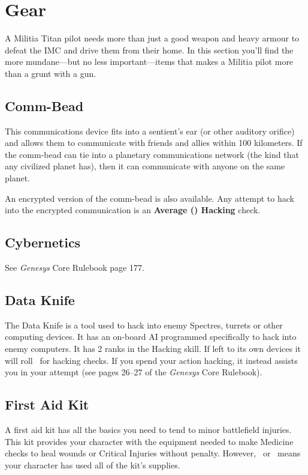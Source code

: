 \documentclass[9pt, openany]{extbook}
\begin{document}
\section{Gear}

A Militia Titan pilot needs more than just a good weapon and heavy armour to defeat the IMC and drive them from their home. In this section you'll find the more mundane---but no less important---items that makes a Militia pilot more than a grunt with a gun.

\subsection{Comm-Bead}
This communications device fits into a sentient’s ear (or other auditory orifice) and allows them to communicate with friends and allies within 100 kilometers. If the comm-bead can tie into a planetary communications network (the kind that any civilized planet has), then it can communicate with anyone on the same planet.

An encrypted version of the comm-bead is also available. Any attempt to hack into the encrypted communication is an \textbf{Average (\DifficultyDie\DifficultyDie) Hacking} check.

\subsection{Cybernetics}
See \emph{Genesys} Core Rulebook page 177.


\subsection{Data Knife}
The Data Knife is a tool used to hack into enemy Spectres, turrets or other computing devices. It has an on-board AI programmed specifically to hack into enemy computers. It has 2 ranks in the Hacking skill. If left to its own devices it will roll \AbilityDie\AbilityDie\ for hacking checks. If you spend your action hacking, it instead assists you in your attempt (see pages 26--27 of the \emph{Genesys} Core Rulebook).


\subsection{First Aid Kit}
A first aid kit has all the basics you need to tend to minor battlefield injuries.  This kit provides your character with the equipment needed to make Medicine checks to heal wounds or Critical Injuries without penalty. However, \Threat\Threat\Threat\ or \Despair\ means your character has used all of the kit’s supplies.
\end{document}
